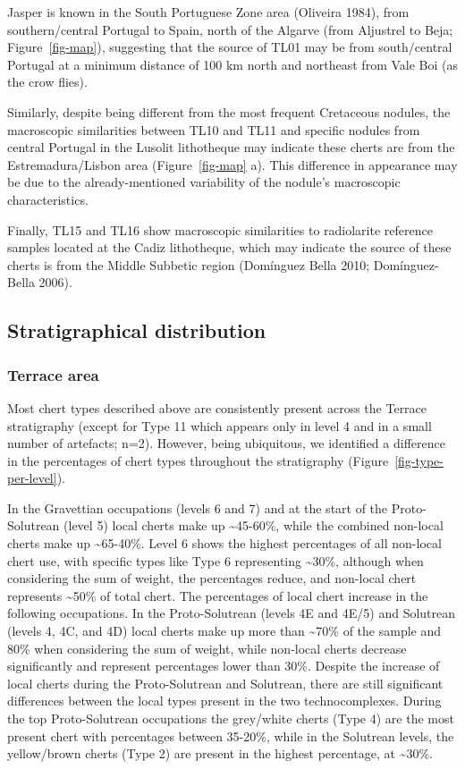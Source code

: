 \documentclass[
  a4paper,
  DIV=11,
  numbers=noendperiod]{scrreprt}
\begin{document}
Jasper is known in the South Portuguese Zone area (Oliveira 1984), from
southern/central Portugal to Spain, north of the Algarve (from Aljustrel
to Beja; Figure~\ref{fig-map}), suggesting that the source of TL01 may
be from south/central Portugal at a minimum distance of 100 km north and
northeast from Vale Boi (as the crow flies).

Similarly, despite being different from the most frequent Cretaceous
nodules, the macroscopic similarities between TL10 and TL11 and specific
nodules from central Portugal in the Lusolit lithotheque may indicate
these cherts are from the Estremadura/Lisbon area (Figure~\ref{fig-map}
a). This difference in appearance may be due to the already-mentioned
variability of the nodule's macroscopic characteristics.

Finally, TL15 and TL16 show macroscopic similarities to radiolarite
reference samples located at the Cadiz lithotheque, which may indicate
the source of these cherts is from the Middle Subbetic region (Domínguez
Bella 2010; Domínguez-Bella 2006).

\subsection{Stratigraphical
distribution}\label{stratigraphical-distribution}

\subsubsection{Terrace area}\label{terrace-area}

Most chert types described above are consistently present across the
Terrace stratigraphy (except for Type 11 which appears only in level 4
and in a small number of artefacts; n=2). However, being ubiquitous, we
identified a difference in the percentages of chert types throughout the
stratigraphy (Figure~\ref{fig-type-per-level}).

In the Gravettian occupations (levels 6 and 7) and at the start of the
Proto-Solutrean (level 5) local cherts make up \textasciitilde45-60\%,
while the combined non-local cherts make up \textasciitilde65-40\%.
Level 6 shows the highest percentages of all non-local chert use, with
specific types like Type 6 representing \textasciitilde30\%, although
when considering the sum of weight, the percentages reduce, and
non-local chert represents \textasciitilde50\% of total chert. The
percentages of local chert increase in the following occupations. In the
Proto-Solutrean (levels 4E and 4E/5) and Solutrean (levels 4, 4C, and
4D) local cherts make up more than \textasciitilde70\% of the sample and
80\% when considering the sum of weight, while non-local cherts decrease
significantly and represent percentages lower than 30\%. Despite the
increase of local cherts during the Proto-Solutrean and Solutrean, there
are still significant differences between the local types present in the
two technocomplexes. During the top Proto-Solutrean occupations the
grey/white cherts (Type 4) are the most present chert with percentages
between 35-20\%, while in the Solutrean levels, the yellow/brown cherts
(Type 2) are present in the highest percentage, at \textasciitilde30\%.
\end{document}
